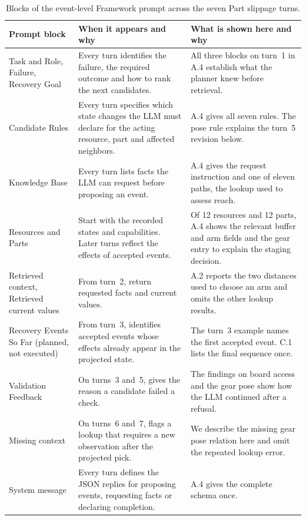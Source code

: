 \documentclass[preprint,12pt,authoryear]{elsarticle}
\begin{document}
\begin{table}[ht!]
\centering\small
\caption{Blocks of the event-level Framework prompt across the seven Part slippage turns.}\label{tab:outline-blocks}
\begin{tabularx}{\linewidth}{@{}>{\raggedright\arraybackslash}p{.235\linewidth}YY@{}}
\toprule
Prompt block & When it appears and why & What is shown here and why \\
\midrule
Task and Role, Failure, Recovery Goal & Every turn identifies the failure, the required outcome and how to rank the next candidates. & All three blocks on turn~1 in A.4 establish what the planner knew before retrieval. \\
\addlinespace
Candidate Rules & Every turn specifies which state changes the LLM must declare for the acting resource, part and affected neighbors. & A.4 gives all seven rules. The pose rule explains the turn~5 revision below. \\
\addlinespace
Knowledge Base & Every turn lists facts the LLM can request before proposing an event. & A.4 gives the request instruction and one of eleven paths, the lookup used to assess reach. \\
\addlinespace
Resources and Parts & Start with the recorded states and capabilities. Later turns reflect the effects of accepted events. & Of 12 resources and 12 parts, A.4 shows the relevant buffer and arm fields and the gear entry to explain the staging decision. \\
\addlinespace
Retrieved context, Retrieved current values & From turn~2, return requested facts and current values. & A.2 reports the two distances used to choose an arm and omits the other lookup results. \\
\addlinespace
Recovery Events So Far (planned, not executed) & From turn~3, identifies accepted events whose effects already appear in the projected state. & The turn~3 example names the first accepted event. C.1 lists the final sequence once. \\
\addlinespace
Validation Feedback & On turns~3 and~5, gives the reason a candidate failed a check. & The findings on board access and the gear pose show how the LLM continued after a refusal. \\
\addlinespace
Missing context & On turns~6 and~7, flags a lookup that requires a new observation after the projected pick. & We describe the missing gear pose relation here and omit the repeated lookup error. \\
\addlinespace
System message & Every turn defines the JSON replies for proposing events, requesting facts or declaring completion. & A.4 gives the complete schema once. \\
\bottomrule
\end{tabularx}
\end{table}
\end{document}
